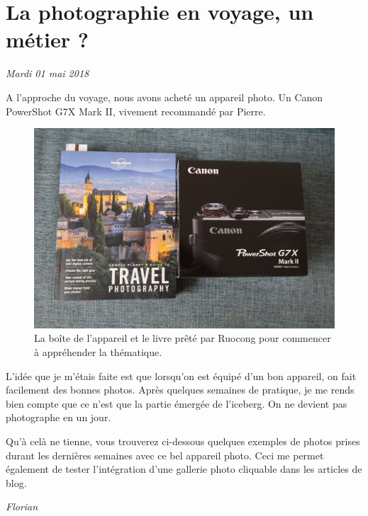 \hypertarget{la-photographie-en-voyage-un-muxe9tier}{%
\section{La photographie en voyage, un métier
?}\label{la-photographie-en-voyage-un-muxe9tier}}

\emph{Mardi 01 mai 2018}

A l'approche du voyage, nous avons acheté un appareil photo. Un Canon
PowerShot G7X Mark II, vivement recommandé par Pierre.

\begin{figure}
\centering
\includegraphics{images/appareil_photo_canon_g7x.JPG}
\caption{La boîte de l'appareil et le livre prêté par Ruocong pour
commencer à appréhender la thématique.}
\end{figure}

L'idée que je m'étais faite est que lorsqu'on est équipé d'un bon
appareil, on fait facilement des bonnes photos. Après quelques semaines
de pratique, je me rends bien compte que ce n'est que la partie émergée
de l'iceberg. On ne devient pas photographe en un jour.

Qu'à celà ne tienne, vous trouverez ci-dessous quelques exemples de
photos prises durant les dernières semaines avec ce bel appareil photo.
Ceci me permet également de tester l'intégration d'une gallerie photo
cliquable dans les articles de blog.

\emph{Florian}
